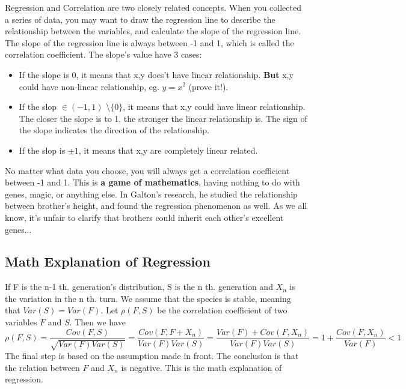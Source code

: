\documentclass[main]{subfiles}
\begin{document}
Regression and Correlation are two closely related concepts. When you collected a series of data, you may want to draw the regression line to describe the relationship between the variables, and calculate the slope of the regression line. The slope of the regression line is always between -1 and 1, which is called the correlation coefficient. 
The slope's value have 3 cases:
\begin{itemize}
    \item If the slope is 0, it means that x,y does't have linear relationship. \textbf{But} x,y could have non-linear relationship, eg. $y=x^2$ (prove it!).
    \item If the slop $\in (-1,1)$ \textbackslash $\{0\}$, it means that x,y could have linear relationship. The closer the slope is to 1, the stronger the linear relationship is. The sign of the slope indicates the direction of the relationship.
    \item If the slop is $\pm 1$, it means that x,y are completely linear related.
\end{itemize}

\begin{warn}[Notice:]
  No matter what data you choose, you will always get a correlation coefficient between -1 and 1. This is \textbf{a game of mathematics}, having nothing to do with genes, magic, or anything else. In Galton's research, he studied the relationship between brother's height, and found the regression phenomenon as well. As we all know, it's unfair to clarify that brothers could inherit each other's excellent genes... \par 
\end{warn}


\subsection{Math Explanation of Regression}
If F is the n-1 th. generation's distribution, S is the n th. generation and $X_n$ is the variation in the n th. turn. We assume that the species is stable, meaning that $Var(S)=Var(F)$. Let $\rho (F,S)$ be the correlation coefficient of two variables $F$ and $S$. Then we have 
$$ \rho(F,S)=\frac{Cov(F,S)}{\sqrt{Var(F)Var(S)}} = \frac{Cov(F,F+X_n)}{Var(F)Var(S)}=\frac{Var(F)+Cov(F,X_n)}{Var(F)Var(S)}=1+\frac{Cov(F,X_n)}{Var(F)}<1$$
The final step is based on the assumption made in front. The conclusion is that the relation between $F$ and $X_n$ is negative. This is the math explanation of regression. \par
\end{document}
